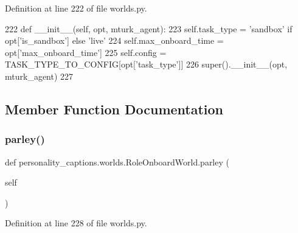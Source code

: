 Definition at line 222 of file worlds.\+py.


\begin{DoxyCode}
222     \textcolor{keyword}{def }\_\_init\_\_(self, opt, mturk\_agent):
223         self.task\_type = \textcolor{stringliteral}{'sandbox'} \textcolor{keywordflow}{if} opt[\textcolor{stringliteral}{'is\_sandbox'}] \textcolor{keywordflow}{else} \textcolor{stringliteral}{'live'}
224         self.max\_onboard\_time = opt[\textcolor{stringliteral}{'max\_onboard\_time'}]
225         self.config = TASK\_TYPE\_TO\_CONFIG[opt[\textcolor{stringliteral}{'task\_type'}]]
226         super().\_\_init\_\_(opt, mturk\_agent)
227 
\end{DoxyCode}


\subsection{Member Function Documentation}
\mbox{\label{classpersonality__captions_1_1worlds_1_1RoleOnboardWorld_aa3a44bacf2761f813788a08dd918965d}} 
\subsubsection{\texorpdfstring{parley()}{parley()}}
{\footnotesize\ttfamily def personality\+\_\+captions.\+worlds.\+Role\+Onboard\+World.\+parley (\begin{DoxyParamCaption}\item[{}]{self }\end{DoxyParamCaption})}



Definition at line 228 of file worlds.\+py.


